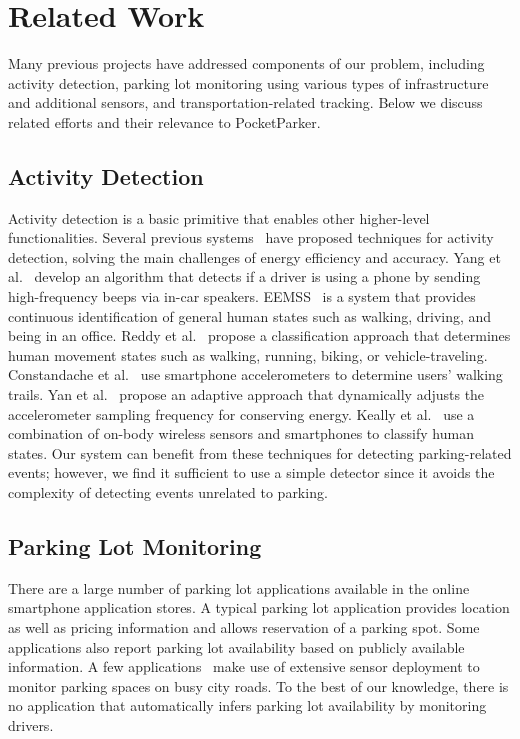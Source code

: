 \section{Related Work}
\label{sec-related}

Many previous projects have addressed components of our problem, including
activity detection, parking lot monitoring using various types of
infrastructure and additional sensors, and transportation-related tracking.
Below we discuss related efforts and their relevance to PocketParker.

\subsection{Activity Detection}

Activity detection is a basic primitive that enables other higher-level
functionalities. Several previous systems~\cite{Constandache:2010:DYS,
Keally:2011:PTP, Reddy:2010:UMP, Yang:2011:DDP, Wang:2009:FEE} have proposed
techniques for activity detection, solving the main challenges of energy
efficiency and accuracy. Yang et al.~\cite{Yang:2011:DDP} develop an algorithm
that detects if a driver is using a phone by sending high-frequency beeps via
in-car speakers. EEMSS~\cite{Wang:2009:FEE} is a system that provides continuous
identification of general human states such as walking, driving, and being in an
office. Reddy et al.~\cite{Reddy:2010:UMP} propose a classification approach
that determines human movement states such as walking, running, biking, or
vehicle-traveling. Constandache et al.~\cite{Constandache:2010:DYS} use
smartphone accelerometers to determine users' walking trails. Yan et
al.~\cite{6246136} propose an adaptive approach that dynamically adjusts the
accelerometer sampling frequency for conserving energy. Keally et
al.~\cite{Keally:2011:PTP} use a combination of on-body wireless sensors and
smartphones to classify human states. Our system can benefit from these
techniques for detecting parking-related events; however, we find it sufficient
to use a simple detector since it avoids the complexity of detecting events
unrelated to parking.

\subsection{Parking Lot Monitoring}

There are a large number of parking lot applications available in the online
smartphone application stores. A typical parking lot application provides
location as well as pricing information and allows reservation of a parking
spot. Some applications also report parking lot availability based on publicly
available information. A few applications~\cite{parker, sfpark} make use of
extensive sensor deployment to monitor parking spaces on busy city roads. To the
best of our knowledge, there is no application that automatically infers parking
lot availability by monitoring drivers.

